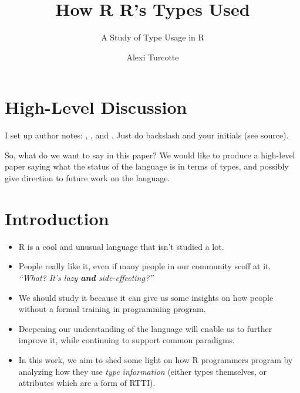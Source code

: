 \documentclass[acmsmall,10pt,review,anonymous]{acmart}\settopmatter{printfolios=true,printccs=false,printacmref=false}
\begin{document}
\title{How R R's Types Used}
\subtitle{A Study of Type Usage in R}


\author{Alexi Turcotte}



\begin{abstract}

\end{abstract}



\maketitle


\section{High-Level Discussion}

I set up author notes:
, , and .
Just do backslash and your initials (see source).

So, what do we want to say in this paper?
We would like to produce a high-level paper saying what the status of the language is in terms of types, and possibly give direction to future work on the language.

%
%
%
%
%
%
\section{Introduction}



\begin{itemize}
    \item R is a cool and unusual language that isn't studied a lot.
    \item People really like it, even if many people in our community scoff at it. \textit{``What? It's lazy \textbf{and} side-effecting?''}
    \item We should study it because it can give us some insights on how people without a formal training in programming program.
    \item Deepening our understanding of the language will enable us to further improve it, while continuing to support common paradigms.
    \item In this work, we aim to shed some light on how R programmers program by analyzing how they use \textit{type information} (either types themselves, or attributes which are a form of RTTI).
\end{itemize}
\end{document}
